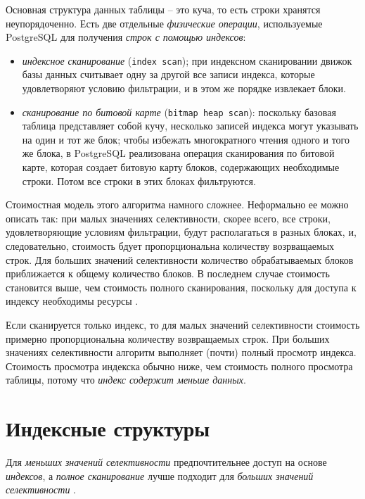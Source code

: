 \documentclass[%
	11pt,
	a4paper,
	utf8,
		]{article}
\begin{document}
Основная структура данных таблицы -- это куча, то есть строки хранятся неупорядоченно. Есть две отдельные \emph{физические операции}, используемые PostgreSQL для получения \emph{строк с помощью индексов}:
\begin{itemize}
	\item \emph{индексное сканирование} (\verb|index scan|); при индексном сканировании движок базы данных считывает одну за другой все записи индекса, которые удовлетворяют условию фильтрации, и в этом же порядке извлекает блоки.
	
	\item \emph{сканирование по битовой карте} (\verb|bitmap heap scan|): поскольку базовая таблица представляет собой кучу, несколько записей индекса могут указывать на один и тот же блок; чтобы избежать многократного чтения одного и того же блока, в PostgreSQL реализована операция сканирования по битовой карте, которая создает битовую карту блоков, содержающих необходимые строки. Потом все строки в этих блоках фильтруются.
\end{itemize}

Стоимостная модель этого алгоритма намного сложнее. Неформально ее можно описать так: при малых значениях селективности, скорее всего, все строки, удовлетворяющие условиям фильтрации, будут располагаться в разных блоках, и, следовательно, стоимость бдует пропорциональна количеству возрващаемых строк. Для больших  значений селективности количество обрабатываемых блоков приближается к общему количество блоков. В последнем случае стоимость становится выше, чем стоимость полного сканирования, поскольку для доступа к индексу необходимы ресурсы \cite[]{dombrovskaya:postgresql-2022}.

Если сканируется только индекс, то для малых значений селективности стоимость примерно пропорциональна количеству возвращаемых строк. При больших значениях селективности алгоритм выполняет (почти) полный просмотр индекса. Стоимость просмотра индекска обычно ниже, чем стоимость полного просмотра таблицы, потому что \emph{индекс содержит меньше данных}.

\section{Индексные структуры}

Для \emph{меньших значений селективности} предпочтительнее доступ на основе \emph{индексов}, а \emph{полное сканирование} лучше подходит для \emph{больших значений селективности} \cite[]{dombrovskaya:postgresql-2022}.
\end{document}
